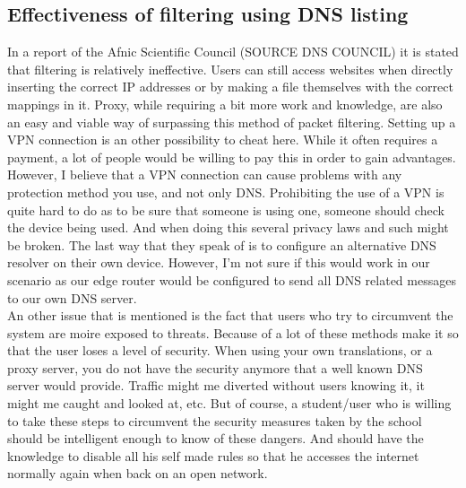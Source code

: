 \subsection{Effectiveness of filtering using DNS listing}
In a report of the Afnic Scientific Council (SOURCE DNS COUNCIL) it is stated that filtering is relatively ineffective. Users can still access websites when directly inserting the correct IP addresses or by making a file themselves with the correct mappings in it. Proxy, while requiring a bit more work and knowledge, are also an easy and viable way of surpassing this method of packet filtering. Setting up a VPN connection is an other possibility to cheat here. While it often requires a payment, a lot of people would be willing to pay this in order to gain advantages. However, I believe that a VPN connection can cause problems with any protection method you use, and not only DNS. Prohibiting the use of a VPN is quite hard to do as to be sure that someone is using one, someone should check the device being used. And when doing this several privacy laws and such might be broken. The last way that they speak of is to configure an alternative DNS resolver on their own device. However, I'm not sure if this would work in our scenario as our edge router would be configured to send all DNS related messages to our own DNS server.\\
An other issue that is mentioned is the fact that users who try to circumvent the system are moire exposed to threats. Because of a lot of these methods make it so that the user loses a level of security. When using your own translations, or a proxy server, you do not have the security anymore that a well known DNS server would provide. Traffic might me diverted without users knowing it, it might me caught and looked at, etc. But of course, a student/user who is willing to take these steps to circumvent the security measures taken by the school should be intelligent enough to know of these dangers. And should have the knowledge to disable all his self made rules so that he accesses the internet normally again when back on an open network. 
